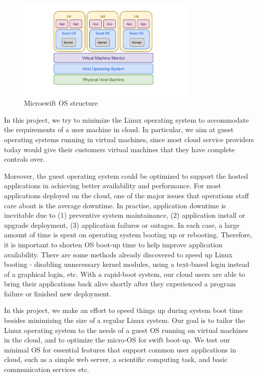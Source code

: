 \begin{figure}[!htb]
\centering
\includegraphics[width=3.4in]{graphs.pdf}
\caption{\label{fig:structure}Microswift OS structure}
\end{figure}

In this project, we try to minimize the Linux operating system to accommodate the requirements of a user machine in cloud. In particular, we aim at guest operating systems running in virtual machines, since most cloud service providers today would give their customers virtual machines that they have complete controls over. 

Moreover, the guest operating system could be optimized to support the hosted applications in achieving better availability and performance. \cite{fox2009above} For most applications deployed on the cloud, one of the major issues that operations staff care about is the average downtime. In practise, application downtime is inevitable due to (1) preventive system maintainance, (2) application install or upgrade deployment, (3) application failures or outages. In each case, a large amount of time is spent on operating system booting up or rebooting. Therefore, it is important to shorten OS boot-up time to help improve application availability. There are some methods already discovered to speed up Linux booting - disabling unnecessary kernel modules, using a text-based login instead of a graphical login, etc. With a rapid-boot system, our cloud users are able to bring their applications back alive shortly after they experienced a program failure or finished new deployment.

In this project, we make an effort to speed things up during system boot time besides minimizing the size of a regular Linux system. Our goal is to tailor the Linux operating system to the needs of a guest OS running on virtual machines in the cloud, and to optimize the micro-OS for swift boot-up. We test our minimal OS for essential features that support common user applications in cloud, such as a simple web server, a scientific computing task, and basic communication services etc. \cite{iosup2011performance}

